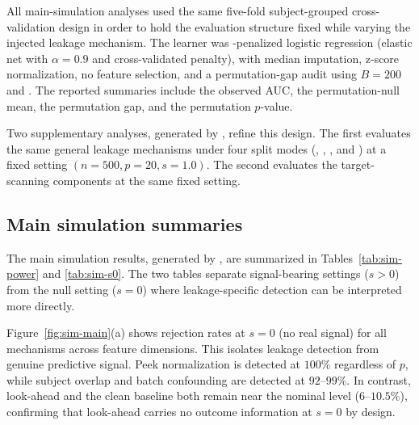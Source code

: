 \documentclass[article,shortnames]{jss}
\begin{document}
All main-simulation analyses used the same five-fold subject-grouped cross-validation design in order to hold the evaluation structure fixed while varying the injected leakage mechanism. The learner was -penalized logistic regression (elastic net with $\alpha = 0.9$ and cross-validated penalty), with median imputation, z-score normalization, no feature selection, and a permutation-gap audit using $B = 200$ and . The reported summaries include the observed AUC, the permutation-null mean, the
permutation gap, and the permutation $p$-value.

Two supplementary analyses, generated by , refine this design. The first evaluates the same general leakage mechanisms under four split modes (, , , and ) at a fixed setting $(n = 500, p = 20, s = 1.0)$. The second evaluates the target-scanning components at the same fixed setting.

\subsection{Main simulation summaries}

The main simulation results, generated by ,
are summarized in Tables~\ref{tab:sim-power} and \ref{tab:sim-s0}. The two
tables separate signal-bearing settings ($s > 0$) from the null setting
($s = 0$) where leakage-specific detection can be interpreted more directly.

Figure~\ref{fig:sim-main}(a) shows rejection rates at $s = 0$ (no real signal)
for all mechanisms across feature dimensions. This isolates leakage detection
from genuine predictive signal. Peek normalization is detected at $100\%$
regardless of $p$, while subject overlap and batch confounding are detected at
$92$--$99\%$. In contrast, look-ahead and the clean baseline both remain near
the nominal level ($6$--$10.5\%$), confirming that look-ahead carries no outcome
information at $s = 0$ by design.
\end{document}
